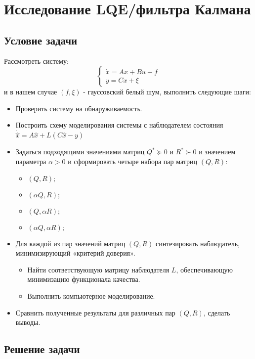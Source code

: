 \chapter{Исследование LQE/фильтра Калмана}
\label{ch:chap2}
\section{Условие задачи}

Рассмотреть систему:
$$
  \begin{cases}
    \dot{x} = Ax + Bu + f \\
    y = Cx + \xi
  \end{cases}
$$ и в нашем случае $(f, \xi)$ - гауссовский белый шум, выполнить следующие шаги:

\begin{itemize}
    \item  Проверить систему на обнаруживаемость.
    \item Построить схему моделирования системы с наблюдателем состояния $\dot{\hat{x}} = A \hat{x} + L(C\hat{x}-y)$
    \item Задаться подходящими значениями матриц $Q^* \succeq 0$ и $R^* \succ 0$ и 
значением параметра $\alpha > 0$ и сформировать четыре набора пар матриц $(Q,R)$:
\begin{itemize}
  \item $(Q,R);$
  \item $(\alpha Q,R);$
  \item $(Q, \alpha R);$
  \item $( \alpha Q, \alpha R);$
\end{itemize}
\item Для каждой из пар значений матриц $(Q,R)$ синтезировать наблюдатель, минимизирующий «критерий доверия».
\begin{itemize}
  \item Найти соответствующую матрицу наблюдателя $L$, обеспечивающую минимизацию функционала качества.
  \item Выполнить компьютерное моделирование.
\end{itemize}
\item Сравнить полученные результаты для различных пар $(Q,R)$, сделать выводы.

\end{itemize}
    
\newpage
\section{Решение задачи}


